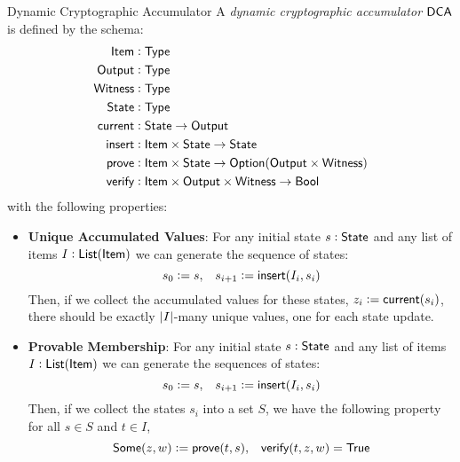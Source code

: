 \begin{definitiontoc}{Dynamic Cryptographic Accumulator}
    A \emph{dynamic cryptographic accumulator} ${\textsf{DCA}}$ is defined by the schema:
    \begin{align*}
        {\textsf{Item}}    &: {\textsf{Type}} \\
        {\textsf{Output}}  &: {\textsf{Type}} \\
        {\textsf{Witness}} &: {\textsf{Type}} \\
        {\textsf{State}}  &: {\textsf{Type}} \\
        {\textsf{current}} &: {\textsf{State}} \to {\textsf{Output}} \\
        {\textsf{insert}} &: {\textsf{Item}} \times {\textsf{State}} \to {\textsf{State}} \\
        {\textsf{prove}}   &: {\textsf{Item}} \times {\textsf{State}} \to {\textsf{Option}}({\textsf{Output}} \times {\textsf{Witness}}) \\
        {\textsf{verify}}  &: {\textsf{Item}} \times {\textsf{Output}} \times {\textsf{Witness}} \to {\textsf{Bool}}
    \end{align*}
    with the following properties:
    \begin{itemize}
        \item \textbf{Unique Accumulated Values}: For any initial state $s : {\textsf{State}}$ and any list of items $I : {\textsf{List}}({\textsf{Item}})$ we can generate the sequence of states:
            \[s_0 := s, \,\,\,\,\, s_{i + 1} := {\textsf{insert}}(I_i, s_i)\]
            Then, if we collect the accumulated values for these states, $z_i := {\textsf{current}}(s_i)$, there should be exactly $\left|I\right|$-many unique values, one for each state update.
        \item \textbf{Provable Membership}: For any initial state $s : {\textsf{State}}$ and any list of items $I : {\textsf{List}}({\textsf{Item}})$ we can generate the sequences of states:
            \[s_0 := s, \,\,\,\,\, s_{i + 1} := {\textsf{insert}}(I_i, s_i)\]
            Then, if we collect the states $s_i$ into a set $S$, we have the following property for all $s \in S$ and $t \in I$,
            \[{\textsf{Some}}(z, w) := {\textsf{prove}}(t, s), \,\,\,\,\, {\textsf{verify}}(t, z, w) = {\textsf{True}}\]
    \end{itemize}
\end{definitiontoc}

